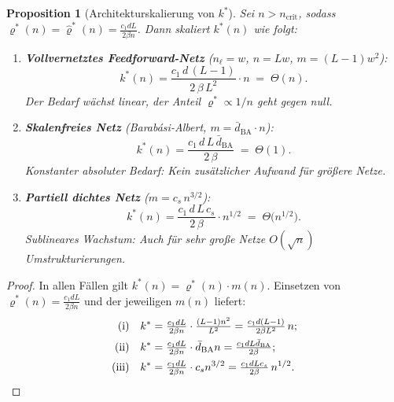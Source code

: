 \documentclass[12pt, a4paper, openany]{report}
\newtheorem{proposition}[theorem]{Proposition}
\begin{document}
\begin{proposition}[Architekturskalierung von $k^*$]
\label{prop:arch_scaling}
Sei $n > n_{\mathrm{crit}}$, sodass $\varrho^*(n) = \hat\varrho^*(n)
= \frac{c_1 dL}{2\beta n}$.  Dann skaliert $k^*(n)$ wie folgt:
\begin{enumerate}[label=(\roman*)]
  \item \textbf{Vollvernetztes Feedforward-Netz} ($n_\ell = w$, $n = Lw$,
    $m = (L-1)w^2$):
    \begin{equation}
      \label{eq:k_dense}
      k^*(n) = \frac{c_1\,d\,(L-1)}{2\,\beta\,L^2}\cdot n
      \;=\; \Theta(n).
    \end{equation}
    Der Bedarf wächst \emph{linear}, der Anteil $\varrho^* \propto 1/n$ geht
    gegen null.
  \item \textbf{Skalenfreies Netz} (Barabási-Albert, $m = \bar{d}_{\mathrm{BA}}\cdot n$):
    \begin{equation}
      \label{eq:k_sparse}
      k^*(n) = \frac{c_1\,d\,L\,\bar{d}_{\mathrm{BA}}}{2\,\beta}
      \;=\; \Theta(1).
    \end{equation}
    Konstanter absoluter Bedarf: Kein zusätzlicher Aufwand für größere Netze.
  \item \textbf{Partiell dichtes Netz} ($m = c_s\,n^{3/2}$):
    \begin{equation}
      \label{eq:k_semi}
      k^*(n) = \frac{c_1\,d\,L\,c_s}{2\,\beta}\cdot n^{1/2}
      \;=\; \Theta\!\bigl(n^{1/2}\bigr).
    \end{equation}
    Sublineares Wachstum: Auch für sehr große Netze $O(\sqrt{n})$
    Umstrukturierungen.
\end{enumerate}
\end{proposition}

\begin{proof}
In allen Fällen gilt $k^*(n) = \varrho^*(n)\cdot m(n)$.  Einsetzen von
$\varrho^*(n) = \frac{c_1 dL}{2\beta n}$ und der jeweiligen $m(n)$ liefert:
\begin{align*}
  \text{(i)} &\quad k^* = \tfrac{c_1 dL}{2\beta n}\cdot\tfrac{(L-1)n^2}{L^2}
                = \tfrac{c_1 d(L-1)}{2\beta L^2}\,n; \\
  \text{(ii)}&\quad k^* = \tfrac{c_1 dL}{2\beta n}\cdot\bar{d}_{\mathrm{BA}} n
                = \tfrac{c_1 dL\bar{d}_{\mathrm{BA}}}{2\beta}; \\
  \text{(iii)}&\quad k^* = \tfrac{c_1 dL}{2\beta n}\cdot c_s n^{3/2}
                = \tfrac{c_1 dLc_s}{2\beta}\,n^{1/2}. \qedhere
\end{align*}
\end{proof}
\end{document}
